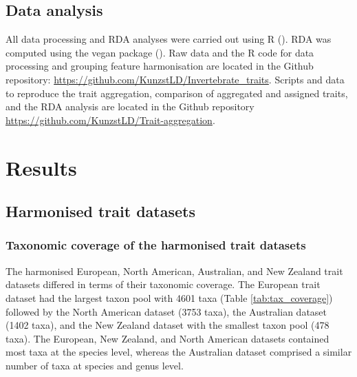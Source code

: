 \documentclass{article}
\begin{document}

\subsection*{Data analysis}

All data processing and RDA analyses were carried out using R (\cite{cite_R}). RDA was computed using the vegan package (\cite{cite_vegan}). Raw data and the R code for data processing and grouping feature harmonisation are located in the Github repository: \url{https://github.com/KunzstLD/Invertebrate_traits}. Scripts and data to reproduce the trait aggregation, comparison of aggregated and assigned traits, and the RDA analysis are located in the Github repository \url{https://github.com/KunzstLD/Trait-aggregation}.

\newpage


\section*{Results}

\subsection*{Harmonised trait datasets}

\subsubsection*{Taxonomic coverage of the harmonised trait datasets}

The harmonised European, North American, Australian, and New Zealand trait datasets differed in terms of their taxonomic coverage. The European trait dataset had the largest taxon pool with 4601 taxa (Table \ref{tab:tax_coverage}) followed by the North American dataset (3753 taxa), the Australian dataset (1402 taxa), and the New Zealand dataset with the smallest taxon pool (478 taxa). The European, New Zealand, and North American datasets contained most taxa at the species level, whereas the Australian dataset comprised a similar number of taxa at species and genus level.
\end{document}
